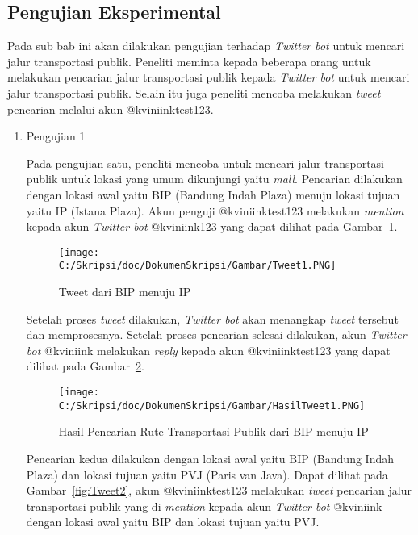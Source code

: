 \subsection{Pengujian Eksperimental}
Pada sub bab ini akan dilakukan pengujian terhadap \textit{Twitter bot} untuk mencari jalur transportasi publik. Peneliti meminta kepada beberapa orang untuk melakukan pencarian jalur transportasi publik kepada \textit{Twitter bot} untuk mencari jalur transportasi publik. Selain itu juga peneliti mencoba melakukan \textit{tweet} pencarian melalui akun @kviniinktest123.

\begin{enumerate}
	\item Pengujian 1
	
	Pada pengujian satu, peneliti mencoba untuk mencari jalur transportasi publik untuk lokasi yang umum dikunjungi yaitu \textit{mall}. Pencarian dilakukan dengan lokasi awal yaitu BIP (Bandung Indah Plaza) menuju lokasi tujuan yaitu IP (Istana Plaza). Akun penguji @kviniinktest123 melakukan \textit{mention} kepada akun \textit{Twitter bot} @kviniink123 yang dapat dilihat pada Gambar~\ref{fig:Tweet1}.
	
	\begin{figure}
		\centering
			\texttt{[image: C:/Skripsi/doc/DokumenSkripsi/Gambar/Tweet1.PNG]}
		\caption{Tweet dari BIP menuju IP}
		\label{fig:Tweet1}
	\end{figure}
	
	Setelah proses \textit{tweet} dilakukan, \textit{Twitter bot} akan menangkap \textit{tweet} tersebut dan memprosesnya. Setelah proses pencarian selesai dilakukan, akun \textit{Twitter bot} @kviniink melakukan \textit{reply} kepada akun @kviniinktest123 yang dapat dilihat pada Gambar~\ref{fig:HasilTweet1}. 
	
		
	\begin{figure}
		\centering
			\texttt{[image: C:/Skripsi/doc/DokumenSkripsi/Gambar/HasilTweet1.PNG]}
		\caption{Hasil Pencarian Rute Transportasi Publik dari BIP menuju IP}
		\label{fig:HasilTweet1}
	\end{figure}
	
	Pencarian kedua dilakukan dengan lokasi awal yaitu BIP (Bandung Indah Plaza) dan lokasi tujuan yaitu PVJ (Paris van Java). Dapat dilihat pada Gambar~\ref{fig:Tweet2}, akun @kviniinktest123 melakukan \textit{tweet} pencarian jalur transportasi publik yang di-\textit{mention} kepada akun \textit{Twitter bot} @kviniink dengan lokasi awal yaitu BIP dan lokasi tujuan yaitu PVJ.
	

\end{enumerate}
